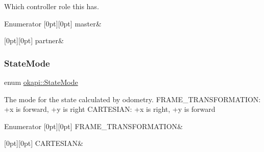Which controller role this has. \begin{DoxyEnumFields}{Enumerator}
[0pt][0pt]{}\mbox{\label{namespaceokapi_a56349a0562b06c6ffc742e94cb1e4361aeb0a191797624dd3a48fa681d3061212}} 
master&\\
\hline

[0pt][0pt]{}\mbox{\label{namespaceokapi_a56349a0562b06c6ffc742e94cb1e4361a7454739e907f5595ae61d84b8547f574}} 
partner&\\
\hline

\end{DoxyEnumFields}
\mbox{\label{namespaceokapi_af37fbd761bd859a00ff4dd4a87dd8c07}} 
\subsubsection{\texorpdfstring{StateMode}{StateMode}}
{\footnotesize\ttfamily enum \mbox{\hyperlink{namespaceokapi_af37fbd761bd859a00ff4dd4a87dd8c07}{okapi\+::\+State\+Mode}}\hspace{0.3cm}{\ttfamily [strong]}}

The mode for the state calculated by odometry. F\+R\+A\+M\+E\+\_\+\+T\+R\+A\+N\+S\+F\+O\+R\+M\+A\+T\+I\+ON\+: +x is forward, +y is right C\+A\+R\+T\+E\+S\+I\+AN\+: +x is right, +y is forward \begin{DoxyEnumFields}{Enumerator}
[0pt][0pt]{}\mbox{\label{namespaceokapi_af37fbd761bd859a00ff4dd4a87dd8c07ad5ed7666e5cebf60d3af20a5a46edf3b}} 
F\+R\+A\+M\+E\+\_\+\+T\+R\+A\+N\+S\+F\+O\+R\+M\+A\+T\+I\+ON&\\
\hline

[0pt][0pt]{}\mbox{\label{namespaceokapi_af37fbd761bd859a00ff4dd4a87dd8c07ac02304094f2866a43251b12946a9a21b}} 
C\+A\+R\+T\+E\+S\+I\+AN&\\
\hline

\end{DoxyEnumFields}


